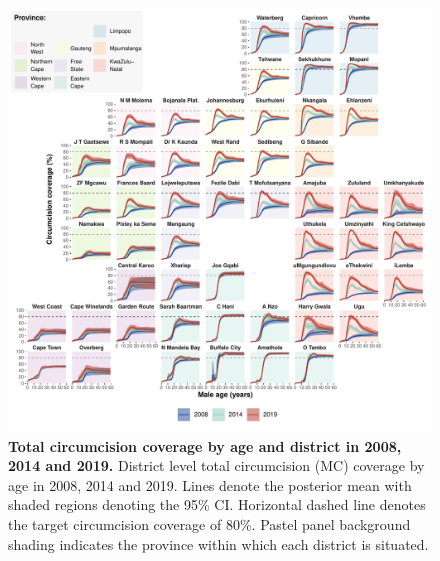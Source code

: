 \documentclass{article}
\begin{document}
\begin{figure}[H]
  \centering
  \includegraphics[width = \linewidth]{Figures/paper/Figure7.pdf}
  \caption{{\bf Total circumcision coverage by age and district in 2008, 2014 and 2019.} District level total circumcision (MC) coverage by age in 2008, 2014 and 2019. Lines denote the posterior mean with shaded regions denoting the 95\% CI. Horizontal dashed line denotes the target circumcision coverage of 80\%. Pastel panel background shading indicates the province within which each district is situated.}
  \label{fig::districtsingleageprev}
\end{figure}

\end{document}
